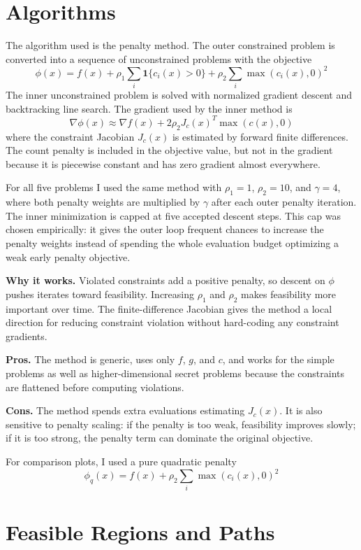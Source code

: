 \section*{Algorithms}

The algorithm used is the penalty method. The outer constrained
problem is converted into a sequence of unconstrained problems with the objective
\[
    \phi(x) = f(x) + \rho_1 \sum_i \mathbf{1}\{c_i(x)>0\}
        + \rho_2 \sum_i \max(c_i(x),0)^2
\]
The inner unconstrained problem is solved with normalized gradient descent and
backtracking line search. The gradient used by the inner method is
\[
    \nabla \phi(x) \approx \nabla f(x)
        + 2\rho_2 J_c(x)^T \max(c(x),0)
\]
where the constraint Jacobian \(J_c(x)\) is estimated by forward finite differences.
The count penalty is included in the objective value, but not in the gradient because
it is piecewise constant and has zero gradient almost everywhere.

For all five problems I used the same method with \(\rho_1=1\), \(\rho_2=10\), and
\(\gamma=4\), where both penalty weights are multiplied by \(\gamma\) after each outer
penalty iteration.  The inner minimization is capped at five accepted descent steps.
This cap was chosen empirically: it gives the outer loop frequent chances to increase
the penalty weights instead of spending the whole evaluation budget optimizing a weak
early penalty objective.

\textbf{Why it works.}  Violated constraints add a positive penalty, so descent on
\(\phi\) pushes iterates toward feasibility.  Increasing \(\rho_1\) and \(\rho_2\)
makes feasibility more important over time.  The finite-difference Jacobian gives the
method a local direction for reducing constraint violation without hard-coding any
constraint gradients.

\textbf{Pros.}  The method is generic, uses only \(f\), \(g\), and \(c\), and works for
the simple problems as well as higher-dimensional secret problems because the
constraints are flattened before computing violations.

\textbf{Cons.}  The method spends extra evaluations estimating \(J_c(x)\).  It is also
sensitive to penalty scaling: if the penalty is too weak, feasibility improves slowly;
if it is too strong, the penalty term can dominate the original objective.

For comparison plots, I used a pure quadratic penalty
\[
    \phi_q(x) = f(x) + \rho_2 \sum_i \max(c_i(x),0)^2
\]

\section*{Feasible Regions and Paths}

